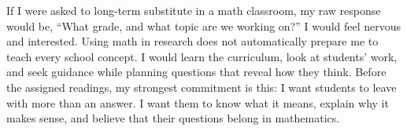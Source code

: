 If I were asked to long-term substitute in a math classroom, my raw response would be, ``What grade, and what topic are we working on?'' I would feel nervous and interested. Using math in research does not automatically prepare me to teach every school concept. I would learn the curriculum, look at students' work, and seek guidance while planning questions that reveal how they think. Before the assigned readings, my strongest commitment is this: I want students to leave with more than an answer. I want them to know what it means, explain why it makes sense, and believe that their questions belong in mathematics.
